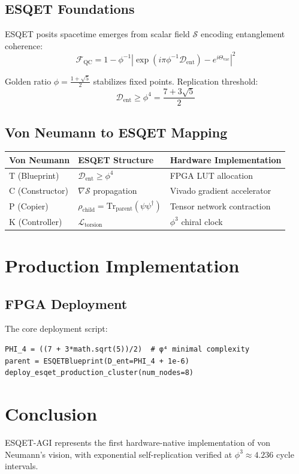 \documentclass[11pt]{article}
\begin{document}
\subsection{ESQET Foundations}

ESQET posits spacetime emerges from scalar field $\mathcal{S}$ encoding entanglement coherence:
\[
\mathcal{F}_{\text{QC}} = 1 - \phi^{-1} \left| \exp(i \pi \phi^{-1} \mathcal{D}_{\text{ent}}) - e^{i \Theta_{\text{vac}}} \right|^2
\]

Golden ratio $\phi = \frac{1 + \sqrt{5}}{2}$ stabilizes fixed points. Replication threshold:
\[
\mathcal{D}_{\text{ent}} \geq \phi^4 = \frac{7 + 3\sqrt{5}}{2}
\]

\subsection{Von Neumann to ESQET Mapping}

\begin{tabular}{|l|l|l|}
\hline
\textbf{Von Neumann} & \textbf{ESQET Structure} & \textbf{Hardware Implementation} \\
\hline
T (Blueprint) & $\mathcal{D}_{\text{ent}} \geq \phi^4$ & FPGA LUT allocation \\
C (Constructor) & $\nabla \mathcal{S}$ propagation & Vivado gradient accelerator \\
P (Copier) & $\rho_{\text{child}} = \text{Tr}_{\text{parent}}(\psi\psi^\dagger)$ & Tensor network contraction \\
K (Controller) & $\mathcal{L}_{\text{torsion}}$ & $\phi^3$ chiral clock \\
\hline
\end{tabular}

\section{Production Implementation}

\subsection{FPGA Deployment}

The core deployment script:
\begin{verbatim}
PHI_4 = ((7 + 3*math.sqrt(5))/2)  # φ⁴ minimal complexity
parent = ESQETBlueprint(D_ent=PHI_4 + 1e-6)
deploy_esqet_production_cluster(num_nodes=8)
\end{verbatim}

\section{Conclusion}

ESQET-AGI represents the first hardware-native implementation of von Neumann's vision, with exponential self-replication verified at $\phi^3 \approx 4.236$ cycle intervals.
\end{document}
